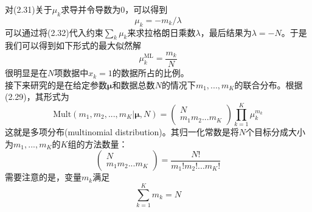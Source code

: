 \documentclass[b5paper]{book}
\numberwithin{equation}{chapter}
\begin{document}
{\begin{equation}
	\end{equation}
	对(2.31)关于$\mu_k$求导并令导数为0，可以得到
	\begin{equation}
		\mu_k = -m_k/\lambda
	\end{equation}
	可以通过将(2.32)代入约束$\sum_k\mu_k$来求拉格朗日乘数$\lambda$，最后结果为$\lambda=-N$。于是我们可以得到如下形式的最大似然解
	\begin{equation}
		\mu_k^{\mathrm{ML}}=\frac{m_k}{N}
	\end{equation}
	很明显是在$N$项数据中$x_k=1$的数据所占的比例。\\
	\indent 接下来研究的是在给定参数$\boldsymbol{\mu}$和数据总数$N$的情况下$m_1,...,m_K$的联合分布。根据(2.29)，其形式为
	\begin{equation}
		\mathrm{Mult}(m_1,m_2,...,m_K|\boldsymbol{\mu},N)=\left(\begin{matrix}N \\ m_1 m_2 ... m_K\end{matrix}\right)\prod_{k=1}^K\mu_k^{m_k}
	\end{equation}
	这就是多项分布(multinomial distribution)。其归一化常数是将$N$个目标分成大小为$m_1,...,m_K$的$K$组的方法数量：
	\begin{equation}
		\left(\begin{matrix}N \\ m_1m_2...m_K\end{matrix}\right)=\frac{N!}{m_1!m_2!...m_K!}
	\end{equation}
	需要注意的是，变量$m_k$满足
	\begin{equation}
		\sum_{k=1}^K m_k =N
	\end{equation}
	}
\end{document}
